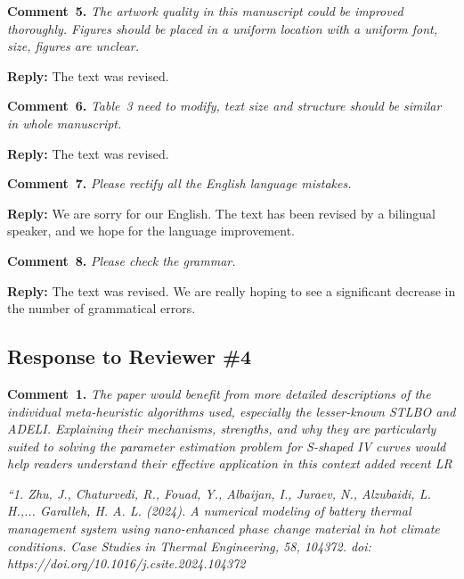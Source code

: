 \documentclass[a4paper,fleqn]{cas-sc}
\begin{document}
\vspace{1cm}
\noindent
\textcolor[rgb]{0.00,0.50,1.00}{\textbf{Comment~5.}}
\emph{The artwork quality in this manuscript could be improved thoroughly.
Figures should be placed in a uniform location with a uniform font, size, figures are unclear.}

\noindent
\textcolor[rgb]{0.51,0.00,0.00}{\textbf{Reply:}}
The text was revised.

\vspace{1cm}
\noindent
\textcolor[rgb]{0.00,0.50,1.00}{\textbf{Comment~6.}}
\emph{Table~3 need to modify, text size and structure should be similar in whole manuscript.}

\noindent
\textcolor[rgb]{0.51,0.00,0.00}{\textbf{Reply:}}
The text was revised.

\vspace{1cm}
\noindent
\textcolor[rgb]{0.00,0.50,1.00}{\textbf{Comment~7.}}
\emph{Please rectify all the English language mistakes.}

\noindent
\textcolor[rgb]{0.51,0.00,0.00}{\textbf{Reply:}}
We are sorry for our English.
The text has been revised by a bilingual speaker, and we hope for the language improvement.


\vspace{1cm}
\noindent
\textcolor[rgb]{0.00,0.50,1.00}{\textbf{Comment~8.}}
\emph{Please check the grammar.}

\noindent
\textcolor[rgb]{0.51,0.00,0.00}{\textbf{Reply:}}
The text was revised.
We are really hoping to see a significant decrease in the number of grammatical errors.

\vspace{1cm}
\subsection*{Response to Reviewer \#4 }


\noindent
\textcolor[rgb]{0.00,0.50,1.00}{\textbf{Comment~1.}}
\emph{The paper would benefit from more detailed descriptions of the individual meta-heuristic algorithms used,
especially the lesser-known STLBO and ADELI.
Explaining their mechanisms, strengths, and why they are particularly suited to solving the parameter estimation problem
for S-shaped IV curves would help readers understand their effective application in this
context added recent LR}

\emph{
``1. Zhu, J., Chaturvedi, R., Fouad, Y., Albaijan, I., Juraev, N., Alzubaidi, L. H.,... Garalleh, H. A. L. (2024).
A numerical modeling of battery thermal management system using nano-enhanced phase
change material in hot climate conditions. Case Studies in Thermal Engineering, 58, 104372.
doi: https://doi.org/10.1016/j.csite.2024.104372
}
\end{document}
